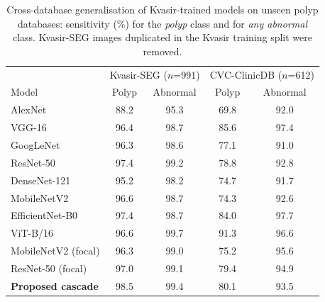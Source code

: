 \begin{table}[t]
\caption{Cross-database generalisation of Kvasir-trained models on unseen polyp databases: sensitivity (\%) for the
\emph{polyp} class and for \emph{any abnormal} class. Kvasir-SEG images duplicated in the Kvasir training split were removed.}
\label{tab:cross}\centering\setlength{\tabcolsep}{3.5pt}
\begin{tabular}{lcccc}\toprule
 & \multicolumn{2}{c}{Kvasir-SEG ($n$=991)} & \multicolumn{2}{c}{CVC-ClinicDB ($n$=612)}\\
Model & Polyp & Abnormal & Polyp & Abnormal\\\midrule
AlexNet & 88.2 & 95.3 & 69.8 & 92.0\\
VGG-16 & 96.4 & 98.7 & 85.6 & 97.4\\
GoogLeNet & 96.3 & 98.6 & 77.1 & 91.0\\
ResNet-50 & 97.4 & 99.2 & 78.8 & 92.8\\
DenseNet-121 & 95.2 & 98.2 & 74.7 & 91.7\\
MobileNetV2 & 96.6 & 98.7 & 74.3 & 92.6\\
EfficientNet-B0 & 97.4 & 98.7 & 84.0 & 97.7\\
ViT-B/16 & 96.6 & 99.7 & 91.3 & 96.6\\
MobileNetV2 (focal) & 96.3 & 99.0 & 75.2 & 95.6\\
ResNet-50 (focal) & 97.0 & 99.1 & 79.4 & 94.9\\
\textbf{Proposed cascade} & 98.5 & 99.4 & 80.1 & 93.5\\
\bottomrule\end{tabular}\end{table}
